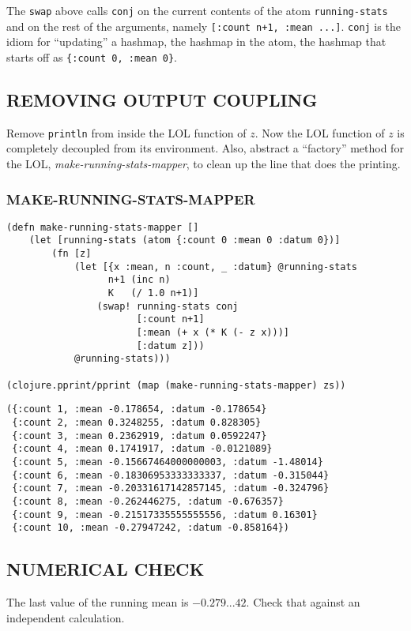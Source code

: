 \documentclass[10pt,oneside,x11names]{article}
\begin{document}
The \texttt{swap} above calls \texttt{conj} on the current contents of the atom
\texttt{running-stats} and on the rest of the arguments, namely
\texttt{[:count n+1, :mean ...]}. \texttt{conj} is the idiom for ``updating'' a hashmap,
the hashmap in the atom, the hashmap that starts off as
\texttt{\{:count 0, :mean 0\}}.

\subsection{REMOVING OUTPUT COUPLING}
\label{REMOVING-OUTPUT-COUPLING}
Remove \texttt{println} from inside the LOL function of \(z\). Now the LOL
function of \(z\) is completely decoupled from its environment. Also,
abstract a ``factory'' method for the LOL, \emph{make-running-stats-mapper}, to
clean up the line that does the printing.

\subsubsection{MAKE-RUNNING-STATS-MAPPER}
\label{make-running-stats-mapper}
\begin{verbatim}
(defn make-running-stats-mapper []
    (let [running-stats (atom {:count 0 :mean 0 :datum 0})]
        (fn [z]
            (let [{x :mean, n :count, _ :datum} @running-stats
                  n+1 (inc n)
                  K   (/ 1.0 n+1)]
                (swap! running-stats conj
                       [:count n+1]
                       [:mean (+ x (* K (- z x)))]
                       [:datum z]))
            @running-stats)))

(clojure.pprint/pprint (map (make-running-stats-mapper) zs))
\end{verbatim}

\begin{verbatim}
({:count 1, :mean -0.178654, :datum -0.178654}
 {:count 2, :mean 0.3248255, :datum 0.828305}
 {:count 3, :mean 0.2362919, :datum 0.0592247}
 {:count 4, :mean 0.1741917, :datum -0.0121089}
 {:count 5, :mean -0.15667464000000003, :datum -1.48014}
 {:count 6, :mean -0.18306953333333337, :datum -0.315044}
 {:count 7, :mean -0.20331617142857145, :datum -0.324796}
 {:count 8, :mean -0.262446275, :datum -0.676357}
 {:count 9, :mean -0.21517335555555556, :datum 0.16301}
 {:count 10, :mean -0.27947242, :datum -0.858164})
\end{verbatim}

\subsection{NUMERICAL CHECK}
\label{numerical-check}
The last value of the running mean is \(-0.279...42\). Check that against
an independent calculation.
\end{document}
